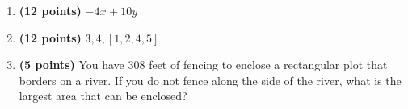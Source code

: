 \documentclass[12pt]{amsart}
\begin{document}
\begin{enumerate}
\vfill 
\def \a{7}\def \atwoone{3}\def \atwotwo{-2}\def \atwothree{2}\def \btwothree{6}\def \sumtwothree{8}\def \diftwothree{-4}\def \bigtwothree{200}\def \powtwothree{36}\def \logtwothree{0.3868528072345416}\def \factortwothree{38}\def \atwofour{1.94}\def \btwofour{1.744}\def \tooshorttwofour{10.1}\def \moneytwofour{10.10}\def \longertwofour{10.10000}\def \atwofive{0.12}\def \btwofive{0.12346}\def \athreeone{6}\def \bthreeone{4}\def \setthreetwo{[3, 7, 7]}\def \athreetwo{3}\def \bthreetwo{7}\def \cthreetwo{7}\def \controlthreethree{5}\def \athreethree{2}\def \topthreethree{1}\def \athreefour{4}\def \bthreefour{3}\def \listthreefour{[1, 2, 3, 5]}\def \afourone{4}\def \bfourone{-2}\def \fracfourone{-2}\def \rootfourtwo{20}\def \simplifiedfourtwo{2 \sqrt{5}}\def \sqrtlistfourtwo{[2, 5]}\def \outfourtwo{2}\def \infourtwo{5}\def \wowfourtwo{1}\def \afourthree{-5}\def \nicethreefour{3x^{2}-x^{}-5}\def \nastythreefour{xyz^{3}-5}\def \cfourthree{-4}\def \dfourthree{10}\def \infourthree{-4x^{}}\def \outfourthree{+10y^{}}\def \afourfour{1409518}\def \nicefourfour{1,409,518}\def \goodfourfour{1,000,000.12345}\def \badfourfour{1,000,000.1}
\item {\bf (12 points)} 
  $\infourthree \outfourthree$ 
\vfill 
\def \a{7}\def \atwoone{2}\def \atwotwo{3}\def \atwothree{5}\def \btwothree{7}\def \sumtwothree{12}\def \diftwothree{-2}\def \bigtwothree{500}\def \powtwothree{16807}\def \logtwothree{0.8270874753469162}\def \factortwothree{38}\def \atwofour{1.42}\def \btwofour{1.326}\def \tooshorttwofour{10.1}\def \moneytwofour{10.10}\def \longertwofour{10.10000}\def \atwofive{0.12}\def \btwofive{0.12346}\def \athreeone{6}\def \bthreeone{4}\def \setthreetwo{[12, 6, 9]}\def \athreetwo{12}\def \bthreetwo{6}\def \cthreetwo{9}\def \controlthreethree{8}\def \athreethree{1}\def \topthreethree{1}\def \athreefour{3}\def \bthreefour{4}\def \listthreefour{[1, 2, 4, 5]}\def \afourone{4}\def \bfourone{-2}\def \fracfourone{-2}\def \rootfourtwo{12}\def \simplifiedfourtwo{2 \sqrt{3}}\def \sqrtlistfourtwo{[2, 3]}\def \outfourtwo{2}\def \infourtwo{3}\def \wowfourtwo{1}\def \afourthree{-5}\def \nicethreefour{3x^{2}-x^{}-5}\def \nastythreefour{xyz^{3}-5}\def \cfourthree{-4}\def \dfourthree{-10}\def \infourthree{-4x^{}}\def \outfourthree{-10y^{}}\def \afourfour{1410674}\def \nicefourfour{1,410,674}\def \goodfourfour{1,000,000.12345}\def \badfourfour{1,000,000.1}
\item {\bf (12 points)} 
 $\athreefour, \bthreefour, \listthreefour$ 
\vfill 
\newpage\def \x{77}\def \y{154}\def \L{308}\def \area{11858}
\item {\bf (5 points)} 
 You have $\L$ feet of fencing to enclose a rectangular plot that borders on a river. If you do not fence along the side of the river, what is the largest area that can be enclosed? \\


\end{enumerate}
\end{document}
